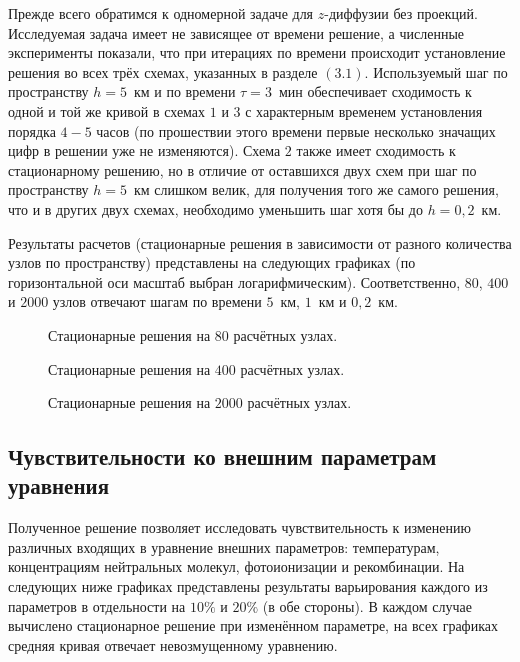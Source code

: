 \documentclass[14pt, a4paper, fleqn]{extarticle}
\begin{document}
Прежде всего обратимся к одномерной задаче для $z$-диффузии без проекций. Исследуемая задача имеет не зависящее от времени решение, а численные эксперименты показали, что при итерациях по времени происходит установление решения во всех трёх схемах, указанных в разделе $(3.1)$. Используемый шаг по пространству $h = 5$~км и по времени $\tau = 3$~мин обеспечивает сходимость к одной и той же кривой в схемах $1$ и $3$ с характерным временем установления порядка $4-5$ часов (по прошествии этого времени первые несколько значащих цифр в решении уже не изменяются). Схема $2$ также имеет сходимость к стационарному решению, но в отличие от оставшихся двух схем при шаг по пространству $h=5$~км слишком велик, для получения того же самого решения, что и в других двух схемах, необходимо уменьшить шаг хотя бы до $h = 0{,}2$~км.

Результаты расчетов (стационарные решения в зависимости от разного количества узлов по пространству) представлены на следующих графиках (по горизонтальной оси масштаб выбран логарифмическим). Соответственно, $80$, $400$ и $2000$ узлов отвечают шагам по времени $5$~км, $1$~км и $0{,}2$~км.
 
\begin{figure}[H]
\caption{Стационарные решения на $80$ расчётных узлах.}
\end{figure}

\begin{figure}[H]
\caption{Стационарные решения на $400$ расчётных узлах.}
\end{figure}

\begin{figure}[H]
\caption{Стационарные решения на $2000$ расчётных узлах.}
\end{figure}

\subsection{Чувствительности ко внешним параметрам уравнения}



Полученное решение позволяет исследовать чувствительность к изменению различных входящих в уравнение внешних параметров: температурам, концентрациям нейтральных молекул, фотоионизации и рекомбинации. На следующих ниже графиках представлены результаты варьирования каждого из параметров в отдельности на $10\%$ и $20\%$ (в обе стороны). В каждом случае вычислено стационарное решение при изменённом параметре, на всех графиках средняя кривая отвечает невозмущенному уравнению.
\end{document}
